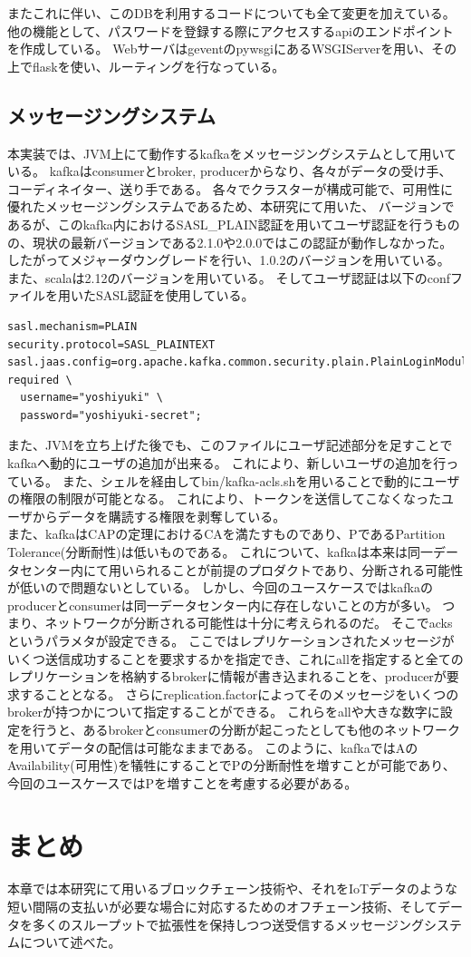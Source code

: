 またこれに伴い、このDBを利用するコードについても全て変更を加えている。
他の機能として、パスワードを登録する際にアクセスするapiのエンドポイントを作成している。
WebサーバはgeventのpywsgiにあるWSGIServerを用い、その上でflaskを使い、ルーティングを行なっている。

\subsection{メッセージングシステム}
本実装では、JVM上にて動作するkafkaをメッセージングシステムとして用いている。
kafkaはconsumerとbroker, producerからなり、各々がデータの受け手、コーディネイター、送り手である。
各々でクラスターが構成可能で、可用性に優れたメッセージングシステムであるため、本研究にて用いた、
バージョンであるが、このkafka内におけるSASL\_PLAIN認証を用いてユーザ認証を行うものの、現状の最新バージョンである2.1.0や2.0.0ではこの認証が動作しなかった。
したがってメジャーダウングレードを行い、1.0.2のバージョンを用いている。
また、scalaは2.12のバージョンを用いている。
そしてユーザ認証は以下のconfファイルを用いたSASL認証を使用している。
\begin{lstlisting}[caption=SASL認証の設定 config/producer.properties  ,label=serverProperties]
sasl.mechanism=PLAIN
security.protocol=SASL_PLAINTEXT
sasl.jaas.config=org.apache.kafka.common.security.plain.PlainLoginModule required \
  username="yoshiyuki" \
  password="yoshiyuki-secret";
\end{lstlisting}
また、JVMを立ち上げた後でも、このファイルにユーザ記述部分を足すことでkafkaへ動的にユーザの追加が出来る。
これにより、新しいユーザの追加を行っている。
また、シェルを経由してbin/kafka-acls.shを用いることで動的にユーザの権限の制限が可能となる。
これにより、トークンを送信してこなくなったユーザからデータを購読する権限を剥奪している。 \\
また、kafkaはCAPの定理におけるCAを満たすものであり、PであるPartition Tolerance(分断耐性)は低いものである。
これについて、kafkaは本来は同一データセンター内にて用いられることが前提のプロダクトであり、分断される可能性が低いので問題ないとしている。
しかし、今回のユースケースではkafkaのproducerとconsumerは同一データセンター内に存在しないことの方が多い。
つまり、ネットワークが分断される可能性は十分に考えられるのだ。
そこでacksというパラメタが設定できる。
ここではレプリケーションされたメッセージがいくつ送信成功することを要求するかを指定でき、これにallを指定すると全てのレプリケーションを格納するbrokerに情報が書き込まれることを、producerが要求することとなる。
さらにreplication.factorによってそのメッセージをいくつのbrokerが持つかについて指定することができる。
これらをallや大きな数字に設定を行うと、あるbrokerとconsumerの分断が起こったとしても他のネットワークを用いてデータの配信は可能なままである。
このように、kafkaではAのAvailability(可用性)を犠牲にすることでPの分断耐性を増すことが可能であり、今回のユースケースではPを増すことを考慮する必要がある。

\section{まとめ}
本章では本研究にて用いるブロックチェーン技術や、それをIoTデータのような短い間隔の支払いが必要な場合に対応するためのオフチェーン技術、そしてデータを多くのスループットで拡張性を保持しつつ送受信するメッセージングシステムについて述べた。